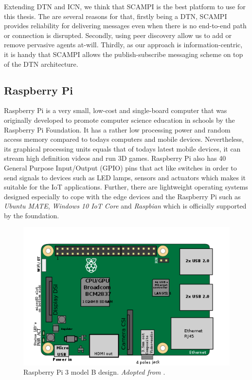 \noindent Extending DTN and ICN, we think that SCAMPI is the best platform to use for this thesis. The are several reasons for that, firstly being a DTN, SCAMPI provides reliability for delivering messages even when there is no end-to-end path or connection is disrupted. Secondly, using peer discovery allow us to add or remove pervasive agents at-will. Thirdly, as our approach is information-centric, it is handy that SCAMPI allows the publish-subscribe messaging scheme on top of the DTN architecture. 


\subsection{Raspberry Pi}
Raspberry Pi  \cite{RaspberryPi} is a very small, low-cost and single-board computer that was originally developed to promote computer science education in schools by the Raspberry Pi Foundation. It has a rather low processing power and random access memory compared to todays computers and mobile devices. Nevertheless, its graphical processing units equals that of todays latest mobile devices, it can stream high definition videos and run 3D games. Raspberry Pi also has 40 General Purpose Input/Output (GPIO) pins that act like switches in order to send signals to devices such as LED lamps, sensors and actuators which makes it suitable for the IoT applications. Further, there are lightweight operating systems designed especially to cope with the edge devices and the Raspberry Pi  such as \textit{Ubuntu MATE},  \textit{Windows 10 IoT Core} and \textit{Raspbian} which is officially supported by the foundation.
\begin{figure}[H]
	\centering
	\includegraphics[scale=0.5]{images/rpi.png}
	\caption{Raspberry Pi  3 model B design. \textit{Adopted from \cite{RASPI}}.}
	\label{fig:rpi}
\end{figure}
